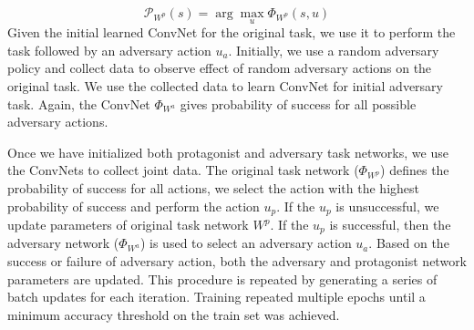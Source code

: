 \documentclass[letterpaper, 10 pt, conference]{ieeeconf}  %
\begin{document}
\begin{equation}
    \mathcal{P}_{W^p}(s) = \arg\max_{u}{\Phi_{W^p}(s,u)}
\end{equation} Given the initial learned ConvNet for the original task, we use it to perform the task followed by an adversary action $u_a$. Initially, we use a random adversary policy and collect data to observe effect of random adversary actions on the original task. We use the collected data to learn ConvNet for initial adversary task. Again, the ConvNet $\Phi_{W^a}$ gives probability of success for all possible adversary actions.

 Once we have initialized both protagonist and adversary task networks, we use the ConvNets to collect joint data. The original task network ($\Phi_{W^p}$) defines the probability of success for all actions, we select the action with the highest probability of success and perform the action $u_p$. If the $u_p$ is unsuccessful, we update parameters of original task network $W^p$. If the $u_p$ is successful, then the adversary network ($\Phi_{W^a}$) is used to select an adversary action $u_a$. Based on the success or failure of adversary action, both the adversary and protagonist network parameters are updated. This procedure is repeated by generating a series of batch updates for each iteration.  Training repeated multiple epochs until a minimum accuracy threshold on the train set was achieved.
\end{document}
